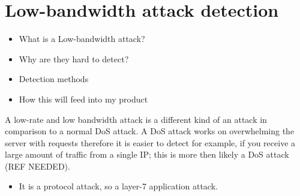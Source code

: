 
\section{Low-bandwidth attack detection}
\begin{itemize}
    \item What is a Low-bandwidth attack?
    \item Why are they hard to detect? 
    \item Detection methods
    \item How this will feed into my product
\end{itemize}

A low-rate and low bandwidth attack is a different kind of an attack in comparison to a normal DoS attack. A DoS attack works on overwhelming the server with requests therefore it is easier to detect for example, if you receive a large amount of traffic from a single IP; this is more then likely a DoS attack (REF NEEDED).

\begin{itemize}
    \item It is a protocol attack, so a layer-7 application attack.
\end{itemize}